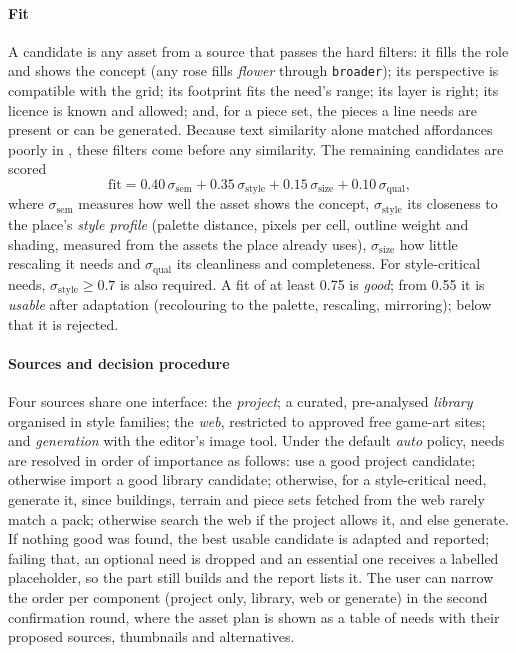 \documentclass[conference]{IEEEtran}
\begin{document}
\paragraph{Fit} A candidate is any asset from a source that passes the hard filters: it
fills the role and shows the concept (any rose fills \emph{flower} through
\texttt{broader}); its perspective is compatible with the grid; its footprint fits the
need's range; its layer is right; its licence is known and allowed; and, for a piece
set, the pieces a line needs are present or can be generated. Because text similarity
alone matched affordances poorly in \cite{chen2025narrative}, these filters come before
any similarity. The remaining candidates are scored
\begin{equation}
\text{fit} = 0.40\,\sigma_{\text{sem}} + 0.35\,\sigma_{\text{style}} + 0.15\,\sigma_{\text{size}} + 0.10\,\sigma_{\text{qual}},
\end{equation}
where $\sigma_{\text{sem}}$ measures how well the asset shows the concept,
$\sigma_{\text{style}}$ its closeness to the place's \emph{style profile} (palette
distance, pixels per cell, outline weight and shading, measured from the assets the place
already uses), $\sigma_{\text{size}}$ how little rescaling it needs and
$\sigma_{\text{qual}}$ its cleanliness and completeness. For style-critical needs,
$\sigma_{\text{style}} \ge 0.7$ is also required. A fit of at least 0.75 is \emph{good};
from 0.55 it is \emph{usable} after adaptation (recolouring to the palette, rescaling,
mirroring); below that it is rejected.

\paragraph{Sources and decision procedure} Four sources share one interface: the
\emph{project}; a curated, pre-analysed \emph{library} organised in style families;
the \emph{web}, restricted to approved free game-art sites; and \emph{generation} with
the editor's image tool. Under the default \emph{auto} policy, needs are resolved in
order of importance as follows: use a good project candidate; otherwise import a good
library candidate; otherwise, for a style-critical need, generate it, since buildings,
terrain and piece sets fetched from the web rarely match a pack; otherwise search the web
if the project allows it, and else generate. If nothing good was found, the best usable
candidate is adapted and reported; failing that, an optional need is dropped and an
essential one receives a labelled placeholder, so the part still builds and the report
lists it. The user can narrow the order per component (project only, library, web or
generate) in the second confirmation round, where the asset plan is shown as a table of
needs with their proposed sources, thumbnails and alternatives.
\end{document}
